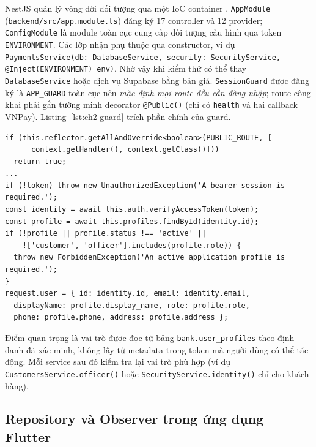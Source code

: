 NestJS quản lý vòng đời đối tượng qua một IoC container \parencite{ch2-fowler-di,ch2-nestjs-providers}. \texttt{AppModule} (\texttt{backend/\allowbreak{}src/\allowbreak{}app.\allowbreak{}module.\allowbreak{}ts}) đăng ký 17 controller và 12 provider; \texttt{ConfigModule} là module toàn cục cung cấp đối tượng cấu hình qua token \texttt{ENVIRONMENT}. Các lớp nhận phụ thuộc qua constructor, ví dụ \texttt{PaymentsService(db: DatabaseService,\allowbreak{} security: SecurityService,\allowbreak{} @Inject(ENVIRONMENT) env)}. Nhờ vậy khi kiểm thử có thể thay \texttt{Database\allowbreak{}Service} hoặc dịch vụ Supabase bằng bản giả. \texttt{SessionGuard} được đăng ký là \texttt{APP\_\allowbreak{}GUARD} toàn cục nên \emph{mặc định mọi route đều cần đăng nhập}; route công khai phải gắn tường minh decorator \texttt{@Public()} (chỉ có \texttt{health} và hai callback VNPay). Listing~\ref{lst:ch2-guard} trích phần chính của guard.

\begin{lstlisting}[caption={Trích \texttt{backend/\allowbreak{}src/\allowbreak{}auth/\allowbreak{}session.\allowbreak{}guard.\allowbreak{}ts}: xác minh phiên và nạp vai trò từ cơ sở dữ liệu},label={lst:ch2-guard}]
if (this.reflector.getAllAndOverride<boolean>(PUBLIC_ROUTE, [
      context.getHandler(), context.getClass()]))
  return true;
...
if (!token) throw new UnauthorizedException('A bearer session is required.');
const identity = await this.auth.verifyAccessToken(token);
const profile = await this.profiles.findById(identity.id);
if (!profile || profile.status !== 'active' ||
    !['customer', 'officer'].includes(profile.role)) {
  throw new ForbiddenException('An active application profile is required.');
}
request.user = { id: identity.id, email: identity.email,
  displayName: profile.display_name, role: profile.role,
  phone: profile.phone, address: profile.address };
\end{lstlisting}

Điểm quan trọng là vai trò được đọc từ bảng \texttt{bank.\allowbreak{}user\_\allowbreak{}profiles} theo định danh đã xác minh, không lấy từ metadata trong token mà người dùng có thể tác động. Mỗi service sau đó kiểm tra lại vai trò phù hợp (ví dụ \texttt{Customers\allowbreak{}Service.\allowbreak{}officer()} hoặc \texttt{Security\allowbreak{}Service.\allowbreak{}identity()} chỉ cho khách hàng).

\subsection{Repository và Observer trong ứng dụng Flutter}
\label{sec:ch2-repository-observer}

